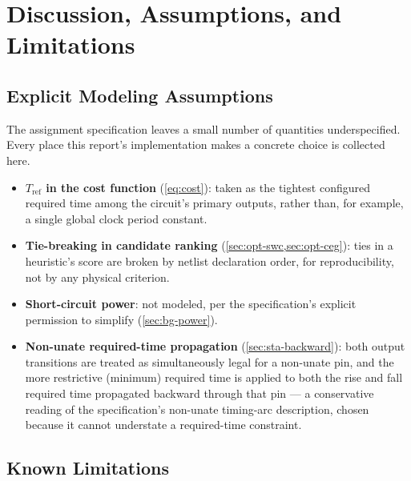 \chapter{Discussion, Assumptions, and Limitations}
\label{ch:discussion}

\section{Explicit Modeling Assumptions}
\label{sec:disc-assumptions}

The assignment specification leaves a small number of quantities
underspecified. Every place this report's implementation makes a concrete
choice is collected here.

\begin{itemize}
    \item \textbf{$T_{\mathrm{ref}}$ in the cost function} (\cref{eq:cost}):
          taken as the tightest configured required time among the
          circuit's primary outputs, rather than, for example, a single
          global clock period constant.
    \item \textbf{Tie-breaking in candidate ranking}
          (\cref{sec:opt-swc,sec:opt-ceg}): ties in a heuristic's score are
          broken by netlist declaration order, for reproducibility, not by
          any physical criterion.
    \item \textbf{Short-circuit power}: not modeled, per the specification's
          explicit permission to simplify (\cref{sec:bg-power}).
    \item \textbf{Non-unate required-time propagation}
          (\cref{sec:sta-backward}): both output transitions are treated as
          simultaneously legal for a non-unate pin, and the more
          restrictive (minimum) required time is applied to both the rise
          and fall required time propagated backward through that pin --- a
          conservative reading of the specification's non-unate timing-arc
          description, chosen because it cannot understate a required-time
          constraint.
\end{itemize}

\section{Known Limitations}
\label{sec:disc-limitations}

